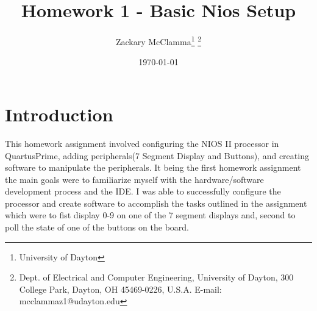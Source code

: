 \documentclass[10pt,a4paper]{article}
\begin{document}
	\title{Homework 1 - Basic Nios Setup}
	\makeatletter
	
	\author{Zackary McClamma\thanks{University of Dayton}
		\thanks{Dept. of Electrical and Computer
			Engineering, University of Dayton, 300 College Park, Dayton, OH
			45469-0226, U.S.A. E-mail:
			mcclammaz1@udayton.edu}}
	
	\makeatother
	
	\date{\today}
	
	\maketitle
	
	\section{Introduction}
	This homework assignment involved configuring the NIOS II processor in QuartusPrime, adding peripherals(7 Segment Display and Buttons), and creating software to manipulate the peripherals. It being the first homework assignment the main goals were to familiarize myself with the hardware/software development process and the IDE. I was able to successfully configure the processor and create software to accomplish the tasks outlined in the assignment which were to fist display 0-9 on one of the 7 segment displays and, second to poll the state of one of the buttons on the board. 
\end{document}
